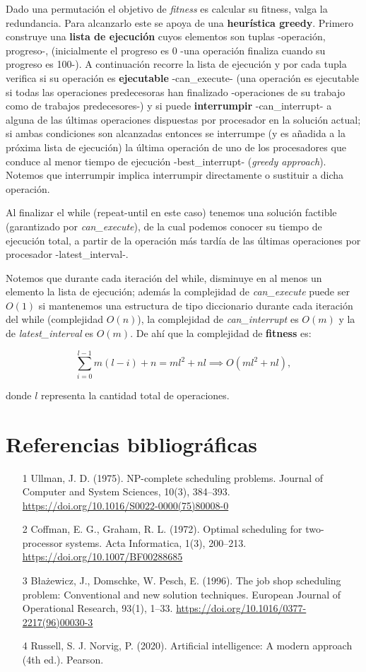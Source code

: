 \documentclass[14pt]{extarticle}
\begin{document}
Dado una permutación el objetivo de \textit{fitness} es calcular su fitness, valga la redundancia. Para alcanzarlo este se apoya de una \textbf{heurística greedy}. Primero construye una \textbf{lista de ejecución} cuyos elementos son tuplas -operación, progreso-, (inicialmente el progreso es 0 -una operación finaliza cuando su progreso es 100-). A continuación recorre la lista de ejecución y por cada tupla verifica si su operación es \textbf{ejecutable} -can\_execute- (una operación es ejecutable si todas las operaciones predecesoras han finalizado -operaciones de su trabajo como de trabajos predecesores-) y si puede \textbf{interrumpir} -can\_interrupt- a alguna de las últimas operaciones dispuestas por procesador en la solución actual; si ambas condiciones son alcanzadas entonces se interrumpe (y es añadida a la próxima lista de ejecución) la última operación de uno de los procesadores que conduce al menor tiempo de ejecución -best\_interrupt- (\textit{greedy approach}). Notemos que interrumpir implica interrumpir directamente o sustituir a dicha operación.

Al finalizar el while (repeat-until en este caso) tenemos una solución factible (garantizado por \textit{can\_execute}), de la cual podemos conocer su tiempo de ejecución total, a partir de la operación más tardía de las últimas operaciones por procesador -latest\_interval-.

Notemos que durante cada iteración del while, disminuye en al menos un elemento la lista de ejecución; además la complejidad de \textit{can\_execute} puede ser $O(1)$ si mantenemos una estructura de tipo diccionario durante cada iteración del while (complejidad $O(n)$), la complejidad de \textit{can\_interrupt} es $O(m)$ y la de \textit{latest\_interval} es $O(m)$. De ahí que la complejidad de \textbf{fitness} es:

\[
\sum_{i = 0}^{l - 1} m(l - i) + n = ml^2 + nl \implies O(ml^2 + nl),
\]

donde $l$ representa la cantidad total de operaciones.

\section*{Referencias bibliográficas}

\begin{itemize}
    \item [1] Ullman, J. D. (1975). NP-complete scheduling problems. Journal of Computer and System Sciences, 10(3), 384–393. \url{https://doi.org/10.1016/S0022-0000(75)80008-0}
    \item [2] Coffman, E. G.,  Graham, R. L. (1972). Optimal scheduling for two-processor systems. Acta Informatica, 1(3), 200–213. \url{https://doi.org/10.1007/BF00288685}
    \item [3] Błażewicz, J., Domschke, W. Pesch, E. (1996). The job shop scheduling problem: Conventional and new solution techniques. European Journal of Operational Research, 93(1), 1–33. \url{https://doi.org/10.1016/0377-2217(96)00030-3}
    \item [4] Russell, S. J. Norvig, P. (2020). Artificial intelligence: A modern approach (4th ed.). Pearson.
\end{itemize}
\end{document}
